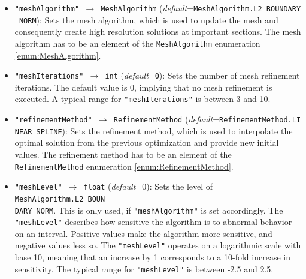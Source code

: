 \documentclass[12pt]{article}
\begin{document}
\begin{mdframed}[backgroundcolor=gray!10, roundcorner=10pt,
		linewidth=1pt]

	\begin{itemize}

		\label{flag:MeshAlgorithm}
		\item \texttt{"meshAlgorithm" $\rightarrow$ MeshAlgorithm}
		      (\emph{default}=\texttt{MeshAlgorithm.L2\_BOUNDARY} \texttt{\_NORM}): Sets the
		      mesh algorithm, which is used to update the mesh and consequently create high
		      resolution solutions at important sections. The mesh algorithm has to be an
		      element of the \texttt{MeshAlgorithm} enumeration \eqref{enum:MeshAlgorithm}.

		      \label{flag:meshIterations}
		\item \texttt{"meshIterations" $\rightarrow$ int}
		      (\emph{default}=\texttt{0}): Sets the number of mesh refinement iterations. The
		      default value is 0, implying that no mesh refinement is executed.
		      A typical range for \texttt{"meshIterations"} is between 3 and 10.

		      \label{flag:RefinementMethod}
		\item \texttt{"refinementMethod" $\rightarrow$ RefinementMethod}
		      (\emph{default}=\texttt{RefinementMethod.LI} \texttt{NEAR\_SPLINE}): Sets the
		      refinement method, which is used to interpolate the optimal solution from the
		      previous optimization and provide new initial values. The refinement method has
		      to be an element of the \texttt{RefinementMethod} enumeration
		      \eqref{enum:RefinementMethod}.

		      \label{flag:meshLevel}
		\item \texttt{"meshLevel" $\rightarrow$ float} (\emph{default}=0): Sets
		      the level of \texttt{MeshAlgorithm.L2\_BOUN\\DARY\_NORM}. This is only used, if
		      \texttt{"meshAlgorithm"} is set accordingly. The \texttt{"meshLevel"} describes
		      how sensitive the algorithm is to abnormal behavior on an interval. Positive
		      values make the algorithm more sensitive, and negative values less so. The
		      \texttt{"meshLevel"} operates on a logarithmic scale with base 10, meaning that
		      an increase by 1 corresponds to a 10-fold increase in sensitivity. The typical
		      range for \texttt{"meshLevel"} is between -2.5 and 2.5.


\end{itemize}
\end{mdframed}
\end{document}
